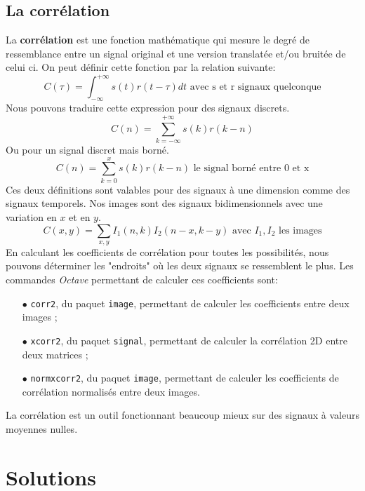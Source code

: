 \documentclass[a4paper,12pt,titlepage]{report}
\newcommand{\octave}{\textit{Octave }}
\begin{document}
		\subsection{La corrélation}
		La \textbf{corrélation} est une fonction mathématique qui mesure le degré de ressemblance entre un signal original et une version translatée et/ou bruitée de celui ci. On peut définir cette fonction par la relation suivante:
		\begin{equation}
			C(\tau)=\int_{-\infty}^{+\infty}s(t)r(t-\tau)dt \text{ avec s et r signaux quelconque}
		\end{equation}
		Nous pouvons traduire cette expression pour des signaux discrets.
		\begin{equation}
			C(n)=\sum_{k = -\infty}^{+\infty}s(k)r(k-n)	
		\end{equation}
		Ou pour un signal discret mais borné.
		\begin{equation}
			C(n)=\sum_{k = 0}^{x}s(k)r(k-n)	\text{ le signal borné entre 0 et x} 
		\end{equation}		
		Ces deux définitions sont valables pour des signaux à une dimension comme des signaux temporels. Nos images sont des signaux bidimensionnels avec une variation en $x$ et en $y$.
		\begin{equation}
			C(x,y)=\sum_{x,y} I_1(n,k)I_2(n-x,k-y) \text{ avec }I_1, I_2 \text{ les images}
		\end{equation}
		En calculant les coefficients de corrélation pour toutes les possibilités, nous pouvons déterminer les "endroits" où les deux signaux se ressemblent le plus.
		Les commandes \octave permettant de calculer ces coefficients sont:
		\begin{itemize}
		\item[$\bullet$] \texttt{corr2}, du paquet \texttt{image}, permettant de calculer les coefficients entre deux images ;
		\item[$\bullet$] \texttt{xcorr2}, du paquet \texttt{signal}, permettant de calculer la corrélation 2D entre deux matrices ;
		\item[$\bullet$] \texttt{normxcorr2}, du paquet \texttt{image}, permettant de calculer les coefficients de corrélation normalisés entre deux images. 
		\end{itemize}		
		La corrélation est un outil fonctionnant beaucoup mieux sur des signaux à valeurs moyennes nulles.
	\section{Solutions}
\end{document}
